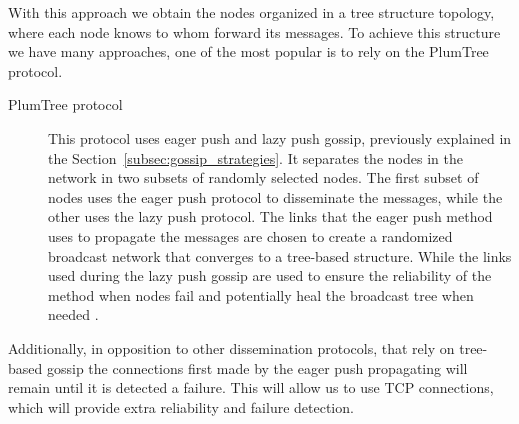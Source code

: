 With this approach we obtain the nodes organized in a tree structure topology, where each node
knows to whom forward its messages. To achieve this structure we have many approaches, one of
the most popular is to rely on the PlumTree protocol.
\begin{description}
      \item[PlumTree protocol] This protocol uses eager push and lazy push gossip, previously
            explained in the Section~\ref{subsec:gossip_strategies}. It separates the nodes in the
            network in two subsets of randomly selected nodes. The first subset of nodes uses the
            eager push protocol to disseminate the messages, while the other uses the lazy push
            protocol.
            The links that the eager push method uses to propagate the messages are
            chosen to create a randomized broadcast network that converges to a tree-based
            structure. While the links used during the lazy push gossip are used to ensure the
            reliability of the method when nodes fail and potentially heal the broadcast tree
            when needed \cite{Leitao2007Tree}.
\end{description}

Additionally, in opposition to other dissemination protocols, that rely on tree-based gossip the
connections first made by the eager push propagating will remain until it is detected a failure.
This will allow us to use \Gls{TCP} connections, which will provide extra reliability and
failure detection.


